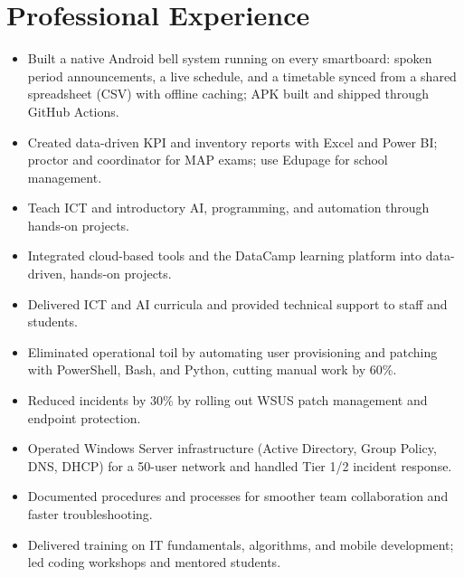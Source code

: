 \documentclass[a4paper,10pt]{article}
\begin{document}
\section*{Professional Experience}
\begin{itemize}
  \item Built a native Android bell system running on every smartboard: spoken period announcements, a live schedule, and a timetable synced from a shared spreadsheet (CSV) with offline caching; APK built and shipped through GitHub Actions.
  \item Created data-driven KPI and inventory reports with Excel and Power BI; proctor and coordinator for MAP exams; use Edupage for school management.
  \item Teach ICT and introductory AI, programming, and automation through hands-on projects.
\end{itemize}
\begin{itemize}
  \item Integrated cloud-based tools and the DataCamp learning platform into data-driven, hands-on projects.
  \item Delivered ICT and AI curricula and provided technical support to staff and students.
\end{itemize}
\begin{itemize}
  \item Eliminated operational toil by automating user provisioning and patching with PowerShell, Bash, and Python, cutting manual work by 60\%.
  \item Reduced incidents by 30\% by rolling out WSUS patch management and endpoint protection.
  \item Operated Windows Server infrastructure (Active Directory, Group Policy, DNS, DHCP) for a 50-user network and handled Tier 1/2 incident response.
  \item Documented procedures and processes for smoother team collaboration and faster troubleshooting.
\end{itemize}
\begin{itemize}
  \item Delivered training on IT fundamentals, algorithms, and mobile development; led coding workshops and mentored students.
\end{itemize}
\end{document}
